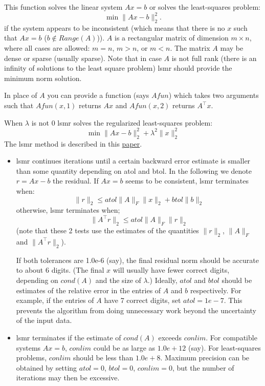 \begin{mandescription}
  This function solves the linear system $Ax = b$ or solves 
  the least-squares problem:
  $$
  \min \| A x - b \|^2_2. 
  $$
  if the system appears to be inconsistent (which means that there is no 
  $x$ such that $A x=b$ ($b \notin Range(A)$)). $A$ is a rectangular matrix of 
  dimension $m \times n$, where all cases are allowed: $m=n$, $m>n$, or $m<n$. 
  The matrix $A$ may be dense or sparse (usually sparse). Note that in case
  $A$ is not full rank (there is an infinity of solutions to the least square
  problem) lsmr should provide the minimum norm solution.
  
  In place of $A$ you can provide a function (says $Afun$) which takes two 
  arguments such that $Afun(x,1)$ returns $A x$ and   $Afun(x,2)$ 
  returns $A^{\top} x$.
  
  When $\lambda$ is not $0$ lsmr solves the regularized least-squares problem:
  $$
  \min \| A x - b \|^2_2 + \lambda^2 \| x \|^2_2 
  $$
  The lsmr method is described in this \href{http://arxiv.org/abs/1006.0758}{paper}.
  

  \begin{itemize}
  \item lsmr continues iterations until a certain backward error estimate is smaller 
    than some quantity depending on atol and btol. In the following we denote $r = A x - b$ 
    the residual. If $A x = b$ seems to be consistent, lsmr terminates when:
    $$
    \| r \|_2  \le  atol \| A \|_F \| x \|_2 + btol \| b \|_2
    $$
    otherwise, lsmr terminates when;
    $$
    \| A^{\top}r \|_2  \le  atol \| A \|_F \| r \|_2
    $$
    (note that these 2 tests use the estimates of the quantities $\|r\|_2$, $\| A \|_F$ 
    and  $\| A^{\top}r \|_2$).

    If both tolerances are 1.0e-6 (say), the final residual norm should be
    accurate to about 6 digits. (The final $x$ will usually have fewer
    correct digits, depending on $cond(A)$ and the size of $\lambda$.)
    Ideally, $atol$ and $btol$ should be estimates of the relative error in the
    entries of $A$ and $b$ respectively.  For example, if the entries of $A$
    have 7 correct digits, set $atol = 1e-7$. This prevents the algorithm
    from doing unnecessary work beyond the uncertainty of the input data.

  \item lsmr terminates if the estimate of $cond(A)$ exceeds $conlim$.
    For compatible systems $Ax = b$, $conlim$ could be as large as $1.0e+12$ (say).  
    For least-squares problems, $conlim$ should be less than $1.0e+8$. 
    Maximum precision can be obtained by setting $atol = 0$, $btol = 0$, $conlim=0$, 
    but the number of iterations may then be excessive.


\end{itemize}
\end{mandescription}
